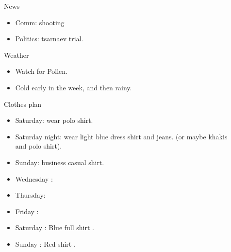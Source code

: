 \documentclass[serif, mathserif, final]{beamer}
\begin{document}
\begin{frame}{}
\begin{columns}
\begin{column}{0.50\linewidth}
\end{column}%

\begin{column}{0.20\linewidth}
\begin{block}{News}
  \begin{itemize} 
    \tiny \item \tiny Comm: shooting
  \item \tiny Politics: tsarnaev trial.
  \end{itemize}
\end{block}
  
\begin{block}{Weather} 
  \begin{itemize}
  \tiny \item \tiny Watch for Pollen.
  \item \tiny Cold early in the week, and then rainy. 
  \end{itemize}
\end{block} 

  \begin{block}{Clothes plan} 
    \begin{itemize} 
      \tiny \item \tiny Saturday: wear polo shirt. 
    \item \tiny Saturday night: wear light blue dress shirt and jeans. (or maybe khakis and polo shirt). 
    \item \tiny Sunday: business casual shirt. 
    \item \tiny Wednesday : 
    \item \tiny Thursday: 
    \item \tiny Friday : 
    \item \tiny Saturday : Blue full shirt . 
    \item \tiny Sunday : Red shirt .
    \end{itemize} 
  \end{block}


\end{column}
\end{columns}
\end{frame}
\end{document}
